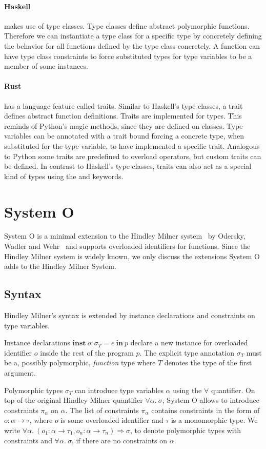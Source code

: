 \documentclass[runningheads]{llncs}
\newcommand{\snip}[1]{\footnotesize{\ttfamily{#1}}}
\begin{document}
\paragraph{Haskell} makes use of type classes. 
Type classes define abstract polymorphic functions. 
Therefore we can instantiate a type class for a specific type by concretely defining the behavior for all functions defined by the type class concretely. 
A function can have type class constraints to force substituted types for type variables to be a member of some instances. 
\paragraph{Rust} has a language feature called traits. Similar to Haskell's type classes, a trait defines abstract function definitions. 
Traits are implemented for types. This reminds of Python's magic methods, since they are defined on classes.
Type variables can be annotated with a trait bound forcing a concrete type, when substituted for the type variable, to have implemented a specific trait. 
Analogous to Python some traits are predefined to overload operators, but custom traits can be defined. 
In contrast to Haskell's type classes, traits can also act as a special kind of types using the \snip{dyn} and \snip{impl} keywords.

\section{System O}
System O is a minimal extension to the Hindley Milner system~\cite{hm78} by Odersky, Wadler and Wehr~\cite{oww95} and supports overloaded identifiers for functions. 
Since the Hindley Milner system is widely known, we only discuss the extensions System O adds to the Hindley Milner System. 
\subsection{Syntax}
Hindley Milner's syntax is extended by instance declarations and constraints on type variables.

Instance declarations $\textbf{inst} \ o : \sigma_T = e \ \textbf{in} \ p$ declare a new instance for overloaded identifier $o$ inside the rest of the program $p$. 
The explicit type annotation $\sigma_T$ must be a, possibly polymorphic, \emph{function} type where $T$ denotes the type of the first argument. 

Polymorphic types $\sigma_T$ can introduce type variables $\alpha$ using the $\forall$ quantifier. 
On top of the original Hindley Milner quantifier $\forall \alpha. \ \sigma$, System O allows to introduce constraints $\pi_\alpha$ on $\alpha$. 
The list of constraints $\pi_\alpha$ contains constraints in the form of $o : \alpha \rightarrow \tau$, where $o$ is some overloaded identifier and $\tau$ is a monomorphic type.
We write $\forall \alpha. \ (o_1 : \alpha \rightarrow \tau_1, o_n : \alpha \rightarrow \tau_n) \Rightarrow \sigma$, to denote polymorphic types with constraints and $\forall \alpha. \ \sigma$, if there are no constraints on $\alpha$. 
\end{document}
